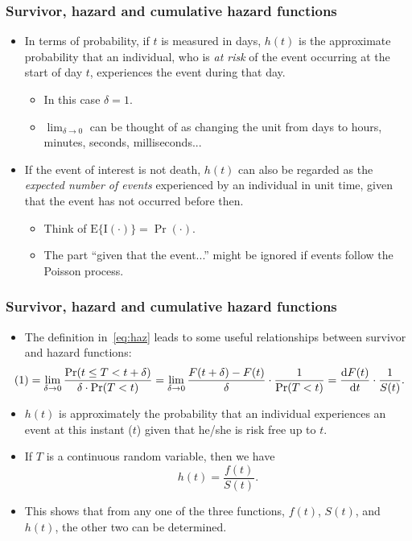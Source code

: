 \documentclass[10pt]{beamer}\usepackage[]{graphicx}\usepackage[]{color}
\newcommand{\dif}{\mathrm{d}}
\newcommand{\E}{\mathrm{E}}
\newcommand{\I}{\mathrm{I}}
\begin{document}
\begin{frame}
  \frametitle{Survivor, hazard and cumulative hazard functions}
  \begin{itemize}
    \item In terms of probability, if $t$ is measured in days, $h(t)$ is the approximate probability that an individual, 
      who is \emph{at risk} of the event occurring at the start of day $t$, experiences the event during that day.
      \begin{itemize}
      \item In this case $\delta = 1$.
      \item $\lim_{\delta \to0}$ can be thought of as changing the unit from days to hours, minutes, seconds, milliseconds...
      \end{itemize}
    \item If the event of interest is not death, $h(t)$ can also be regarded as the \emph{expected number of events}
      experienced by an individual in unit time, given that the event has not occurred before then. 
      \begin{itemize}
        \item Think of $\E\{\I(\cdot)\} = \Pr(\cdot)$.
        \item The part ``given that the event...'' might be ignored if events follow the Poisson process.
        \end{itemize}
      \end{itemize}
\end{frame}

\begin{frame}
  \frametitle{Survivor, hazard and cumulative hazard functions}
  \begin{itemize}
    \item The definition in~\eqref{eq:haz} leads to some useful relationships between survivor and hazard functions:
      \begin{equation*}
        \hspace{-.5cm}
        (1) = \lim_{\delta\to0}\frac{\Pr(t\le T < t + \delta)}{\delta\cdot\Pr(T < t)} = 
        \lim_{\delta\to0}\frac{F(t + \delta) - F(t)}{\delta} \cdot \frac{1}{\Pr(T < t)} =
        \frac{\dif F(t)}{\dif t}\cdot \frac{1}{S(t)}.
      \end{equation*}
    \item $h(t)$ is approximately the probability that an individual experiences an event at this instant ($t$)
      given that he/she is risk free up to $t$.
    \item If $T$ is a continuous random variable, then we have 
      \begin{equation}
        h(t) = \frac{f(t)}{S(t)}.
        \label{eq:haz2}
      \end{equation}
    \item This shows that from any one of the three functions, $f(t)$, $S(t)$, and $h(t)$, 
      the other two can be determined. 
  \end{itemize}
\end{frame}
\end{document}
